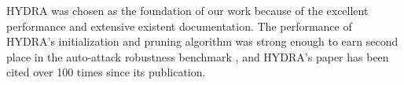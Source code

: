 \documentclass[journal,onecolumn,12pt]{IEEEtran}
\begin{document}
    
    
    
    
    
    

HYDRA was chosen as the foundation of our work because of the excellent performance and extensive existent documentation. The performance of HYDRA's initialization and pruning algorithm was strong enough to earn second place in the auto-attack robustness benchmark \cite{autoattack}, and HYDRA's paper has been cited over 100 times since its publication.
\end{document}

